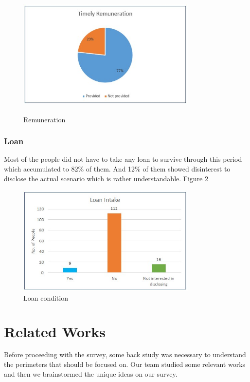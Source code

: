 \documentclass[11pt]{article}
\begin{document}
\begin{figure}[!ht]
	\centering
	\includegraphics[width=0.8\textwidth, height=2.5in]{Images/Finance/Remuneration.jpg}
	\caption{Remuneration}
	\centering
	\label{Remuneration}
\end{figure}

\subsubsection{Loan}
Most of the people did not have to take any loan to survive through this period which accumulated to 82\% of them. And 12\% of them showed disinterest to disclose the actual scenario which is rather understandable. Figure \ref{Loan}

\begin{figure}[!ht]
	\centering
	\includegraphics[width=0.8\textwidth]{Images/Finance/Loan.jpg}
	\caption{Loan condition}
	\centering
	\label{Loan}
\end{figure}

\section{Related Works}
Before proceeding with the survey, some back study was necessary to understand the perimeters that should be focused on. Our team studied some relevant works and then we brainstormed the unique ideas on our survey. 
\end{document}
